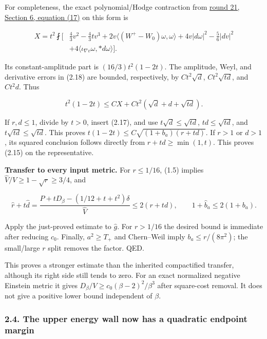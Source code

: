 \documentclass[
  11pt,
]{article}
\begin{document}
For completeness, the exact polynomial/Hodge contraction from
\href{../mathematics/current/round21_analytic.md}{round 21, Section 6,
equation (17)} on this form is

\[
\begin{split}
 X=t^2\fint\bigl[&\tfrac43v^2-\tfrac43t v^3
 +2v\langle(W^+-W_0)\omega,\omega\rangle
 +4v|d\omega|^2-\tfrac56|dv|^2\\
 &+4\langle\iota_{\nabla v}\omega,*d\omega\rangle\bigr].
\end{split}
 \tag{2.18}
\]

Its constant-amplitude part is \((16/3)t^2(1-2t)\). The amplitude, Weyl,
and derivative errors in (2.18) are bounded, respectively, by
\(Ct^2\sqrt d\), \(Ct^2\sqrt{td}\), and \(Ct^2d\). Thus

\[
 t^2(1-2t)\le CX+Ct^2(\sqrt d+d+\sqrt{td}).
 \tag{2.19}
\]

If \(r,d\le1\), divide by \(t>0\), insert (2.17), and use
\(t\sqrt d\le\sqrt{td}\), \(td\le\sqrt{td}\), and
\(t\sqrt{td}\le\sqrt{td}\). This proves
\(t(1-2t)\le C\sqrt{(1+b_a)(r+td)}\). If \(r>1\) or \(d>1\), its squared
conclusion follows directly from \(r+td\ge\min(1,t)\). This proves
(2.15) on the representative.

\textbf{Transfer to every input metric.} For \(r\le1/16\), (1.5) implies
\(\widehat V/V\ge1-\sqrt r\ge3/4\), and

\[
 \widehat r+t\widehat d
 =\frac{P+tD_\beta-(1/12+t+t^2)\delta}{\widehat V}
 \le2(r+td),\qquad
 1+\widehat b_a\le2(1+b_a).
\]

Apply the just-proved estimate to \(\widehat g\). For \(r>1/16\) the
desired bound is immediate after reducing \(c_0\). Finally,
\(a^2\ge T_+\) and Chern--Weil imply \(b_a\le r/(8\pi^2)\); the
small/large \(r\) split removes the factor. QED.

This proves a stronger estimate than the inherited compactified
transfer, although its right side still tends to zero. For an exact
normalized negative Einstein metric it gives
\(D_\beta/V\ge c_0(\beta-2)^2/\beta^3\) after square-cost removal. It
does not give a positive lower bound independent of \(\beta\).

\hypertarget{the-upper-energy-wall-now-has-a-quadratic-endpoint-margin}{%
\subsubsection{2.4. The upper energy wall now has a quadratic endpoint
margin}\label{the-upper-energy-wall-now-has-a-quadratic-endpoint-margin}}
\end{document}
